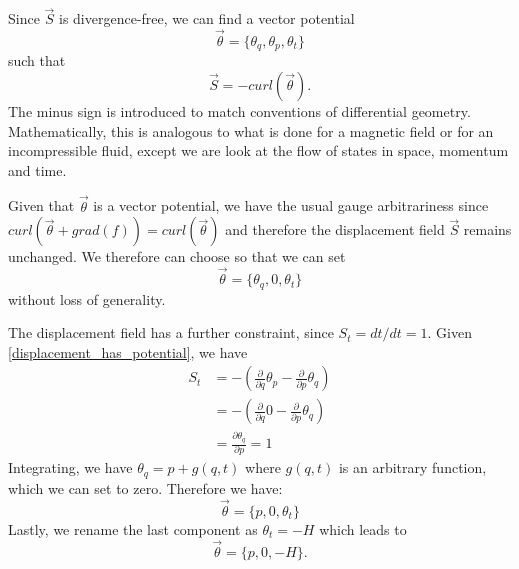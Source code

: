 \documentclass[10pt,twocolumn, nofootinbib]{revtex4-2}
\begin{document}
Since $\vec{S}$ is divergence-free, we can find a vector potential
\begin{equation}
	\vec{\theta} = \{\theta_q, \theta_p, \theta_t\}
\end{equation}
such that
\begin{equation}\label{displacement_has_potential}
	\vec{S} = -curl(\vec{\theta}).
\end{equation}
The minus sign is introduced to match conventions of differential geometry. Mathematically, this is analogous to what is done for a magnetic field or for an incompressible fluid, except we are look at the flow of states in space, momentum and time.

Given that $\vec{\theta}$ is a vector potential, we have the usual gauge arbitrariness since $curl(\vec{\theta} + grad(f)) = curl(\vec{\theta})$ and therefore the displacement field $\vec{S}$ remains unchanged. We therefore can choose so that we can set
\begin{equation}
	\vec{\theta} = \{\theta_q, 0, \theta_t\}
\end{equation}
without loss of generality.

The displacement field has a further constraint, since $S_t = dt/ dt = 1$. Given \ref{displacement_has_potential}, we have
\begin{align*}
	S_t &= - \left(\frac{\partial}{\partial q}  \theta_p - \frac{\partial}{\partial p}  \theta_q\right) \\
	&= - \left(\frac{\partial}{\partial q}  0 - \frac{\partial}{\partial p}  \theta_q\right) \\
	& = \frac{\partial \theta_q}{\partial p} = 1
\end{align*}
Integrating, we have $\theta_q = p + g(q,t)$ where $g(q,t)$ is an arbitrary function, which we can set to zero. Therefore we have:
\begin{equation}
	\vec{\theta} = \{p, 0, \theta_t\}
\end{equation}
Lastly, we rename the last component as $\theta_t = -H$ which leads to 
\begin{equation}\label{potential_final}
	\vec{\theta} = \{p, 0, -H\}.
\end{equation}
\end{document}
